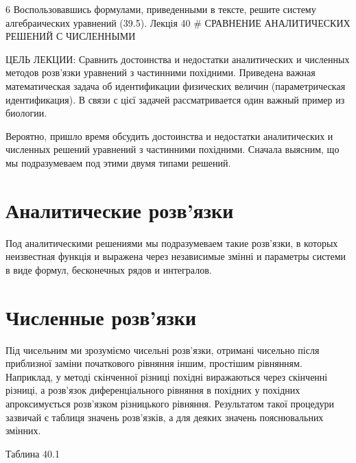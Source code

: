 \documentclass[
  ukrainian,
]{article}
\begin{document}
6 Воспользовавшись формулами, приведенными в тексте, решите систему
алгебраических уравнений (39.5). Лекція 40 \# СРАВНЕНИЕ АНАЛИТИЧЕСКИХ
РЕШЕНИЙ С ЧИСЛЕННЫМИ

ЦЕЛЬ ЛЕКЦИИ: Сравнить достоинства и недостатки аналитических и численных
методов розв'язки уравнений з частинними похідними. Приведена важная
математическая задача об идентификации физических величин
(параметрическая идентификация). В связи с цієї задачей рассматривается
один важный пример из биологии.

Вероятно, пришло время обсудить достоинства и недостатки аналитических и
численных решений уравнений з частинними похідними. Сначала выясним, що
мы подразумеваем под этими двумя типами решений.

\section{Аналитические
розв'язки}\label{ux430ux43dux430ux43bux438ux442ux438ux447ux435ux441ux43aux438ux435-ux440ux43eux437ux432ux44fux437ux43aux438}

Под аналитическими решениями мы подразумеваем такие розв'язки, в которых
неизвестная функція и выражена через независимые змінні и параметры
системи в виде формул, бесконечных рядов и интегралов.

\section{Численные
розв'язки}\label{ux447ux438ux441ux43bux435ux43dux43dux44bux435-ux440ux43eux437ux432ux44fux437ux43aux438}

Під чисельним ми зрозуміємо чисельні розв'язки, отримані чисельно після
приблизної заміни початкового рівняння іншим, простішим рівнянням.
Наприклад, у методі скінченної різниці похідні виражаються через
скінченні різниці, а розв'язок диференціального рівняння в похідних у
похідних апроксимується розв'язком різницького рівняння. Результатом
такої процедури зазвичай є таблиця значень розв'язків, а для деяких
значень пояснювальних змінних.

Таблина 40.1
\end{document}
